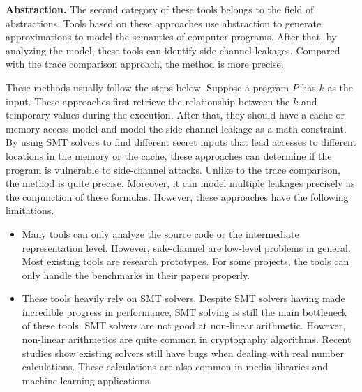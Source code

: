 \textbf{Abstraction.} The second category of these tools belongs to the field of abstractions. Tools based on these approaches use abstraction to generate approximations to model the semantics of computer programs. After that, by analyzing the model, these tools can identify side-channel leakages. Compared with the trace comparison approach, the method is more precise.

These methods usually follow the steps below. Suppose a program $P$ has $k$ as the input. These approaches first retrieve the relationship between the $k$ and temporary values during the execution. After that, they should have a cache or memory access model and model the side-channel leakage as a math constraint. By using SMT solvers to find different secret inputs that lead accesses to different locations in the memory or the cache, these approaches can determine if the program is vulnerable to side-channel attacks.
Unlike to the trace comparison, the method is quite precise. Moreover, it can model multiple leakages precisely as the conjunction of these formulas. However, these approaches have the following limitations.

\begin{itemize}
    \item Many tools can only analyze the source code or the intermediate representation level. However, side-channel are low-level problems in general.  Most existing tools are research prototypes. For some projects, the tools can only handle the benchmarks in their papers properly. 
    \item These tools heavily rely on SMT solvers. Despite SMT solvers having made incredible progress in performance, SMT solving is still the main bottleneck of these tools. SMT solvers are not good at non-linear arithmetic. However, non-linear arithmetics are quite common in cryptography algorithms.  Recent studies show existing solvers still have bugs when dealing with real number calculations. These calculations are also common in media libraries and machine learning applications.
\end{itemize}

